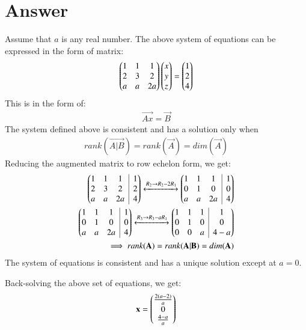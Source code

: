 \documentclass[journal,12pt,twocolumn]{IEEEtran}
\begin{document}
\section{Answer}
Assume that $a$ is any real number. The above system of equations can be expressed in the form of matrix:
\begin{align}
\begin{pmatrix}1 & 1 & 1\\2 & 3 & 2\\a & a & 2a\end{pmatrix} \begin{pmatrix}x\\y\\z\end{pmatrix} = \begin{pmatrix}1\\2\\4\end{pmatrix}
\end{align}
This is in the form of:
\begin{align}
\label{eqn_aug}
\vec{Ax}=\vec{B}
\end{align}
The system defined above is consistent and has a solution only when
\begin{align}
rank(\vec{A|B}) = rank(\vec{A}) = dim(\vec{A})
\end{align}
Reducing the augmented matrix to row echelon form, we get:
\begin{align}
\myvec{1 & 1 & 1 & \BAR & 1 \\2 & 3 & 2 & \BAR & 2 \\a & a & 2a & \BAR & 4}
\xleftrightarrow[]{R_2\rightarrow R_2-2R_1}
\myvec{1 & 1 & 1 & \BAR & 1 \\0 & 1 & 0 & \BAR & 0 \\a & a & 2a & \BAR & 4}
\\ \myvec{1 & 1 & 1 & \BAR & 1 \\0 & 1 & 0 & \BAR & 0 \\a & a & 2a & \BAR & 4}\xleftrightarrow[]{R_3\rightarrow R_3-aR_1}
\myvec{1 & 1 & 1 & \BAR & 1 \\0 & 1 & 0 & \BAR & 0 \\0 & 0 & a & \BAR & 4-a}
\\ \implies rank(\vec{A}) = rank(\vec{A|B}) = dim(\vec{A})
\end{align}
The system of equations is consistent and has a unique solution except at $a = 0$.

Back-solving the above set of equations, we get:
\begin{align}
\mathbf{x} = \begin{pmatrix}\frac{2(a - 2)}{a} \\ 0 \\ \frac{4-a}{a}\end{pmatrix}
\end{align}
\end{document}
